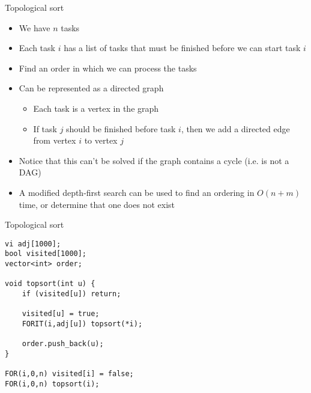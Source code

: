 \documentclass[12pt,t]{beamer}
\newcommand{\bi}{\begin{itemize}}
\newcommand{\ei}{\end{itemize}}
\begin{document}

\begin{frame}{Topological sort}
    \vspace{5pt}
    \bi
        \item We have $n$ tasks
        \item Each task $i$ has a list of tasks that must be finished before we can start task $i$
        \item Find an order in which we can process the tasks
        \vspace{5pt}
        \item Can be represented as a directed graph
            \bi
                \item Each task is a vertex in the graph
                \item If task $j$ should be finished before task $i$, then we add a directed edge from vertex $i$ to vertex $j$
            \ei
        \vspace{5pt}
        \item Notice that this can't be solved if the graph contains a cycle (i.e. is not a DAG)
        \vspace{5pt}
        \item A modified depth-first search can be used to find an ordering in $O(n + m)$ time, or determine that one does not exist
    \ei
\end{frame}

\begin{frame}[fragile]{Topological sort}
    \begin{verbatim}
vi adj[1000];
bool visited[1000];
vector<int> order;

void topsort(int u) {
    if (visited[u]) return;

    visited[u] = true;
    FORIT(i,adj[u]) topsort(*i);

    order.push_back(u);
}

FOR(i,0,n) visited[i] = false;
FOR(i,0,n) topsort(i);
    \end{verbatim}
\end{frame}

\end{document}
